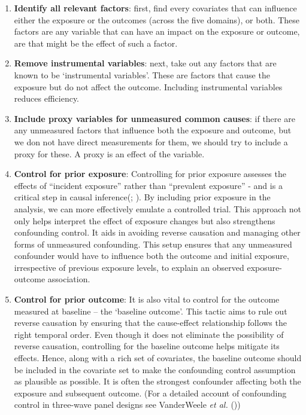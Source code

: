 \documentclass[
  singlecolumn,
  9pt]{article}
\begin{document}
\begin{enumerate}
\def\labelenumi{\arabic{enumi}.}
\item
  \textbf{Identify all relevant factors}: first, find every covariates
  that can influence either the exposure or the outcomes (across the
  five domains), or both. These factors are any variable that can have
  an impact on the exposure or outcome, are that might be the effect of
  such a factor.
\item
  \textbf{Remove instrumental variables}: next, take out any factors
  that are known to be `instrumental variables'. These are factors that
  cause the exposure but do not affect the outcome. Including
  instrumental variables reduces efficiency.
\item
  \textbf{Include proxy variables for unmeasured common causes}: if
  there are any unmeasured factors that influence both the exposure and
  outcome, but we don not have direct measurements for them, we should
  try to include a proxy for these. A proxy is an effect of the
  variable.
\item
  \textbf{Control for prior exposure}: Controlling for prior exposure
  assesses the effects of ``incident exposure'' rather than ``prevalent
  exposure'' - and is a critical step in causal
  inference(;
  ). By including prior
  exposure in the analysis, we can more effectively emulate a controlled
  trial. This approach not only helps interpret the effect of exposure
  changes but also strengthens confounding control. It aids in avoiding
  reverse causation and managing other forms of unmeasured confounding.
  This setup ensures that any unmeasured confounder would have to
  influence both the outcome and initial exposure, irrespective of
  previous exposure levels, to explain an observed exposure-outcome
  association.
\item
  \textbf{Control for prior outcome}: It is also vital to control for
  the outcome measured at baseline -- the `baseline outcome'. This
  tactic aims to rule out reverse causation by ensuring that the
  cause-effect relationship follows the right temporal order. Even
  though it does not eliminate the possibility of reverse causation,
  controlling for the baseline outcome helps mitigate its effects.
  Hence, along with a rich set of covariates, the baseline outcome
  should be included in the covariate set to make the confounding
  control assumption as plausible as possible. It is often the strongest
  confounder affecting both the exposure and subsequent outcome. (For a
  detailed account of confounding control in three-wave panel designs
  see VanderWeele \emph{et al.} ())
\end{enumerate}
\end{document}

